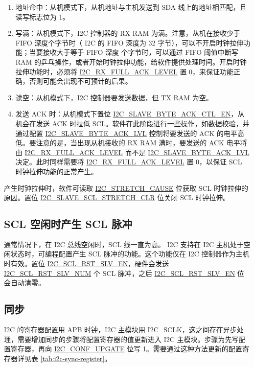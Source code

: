 \documentclass[main\_\_CN.tex]{subfiles}
\begin{document}
\begin{enumerate}
\item 地址命中：从机模式下，从机地址与主机发送到 SDA 线上的地址相匹配，且读写标志位为 1。
\item 写满：从机模式下，I2C 控制器的 RX RAM 为满。注意，从机在接收少于 FIFO 深度个字节时（\chipseries{} I2C 的 FIFO 深度为 32 字节），可以不开启时钟拉伸功能；当要接收大于等于 FIFO 深度 个字节时，可以通过 FIFO 阈值中断写 RAM 的乒乓操作，或者开始时钟拉伸功能，给软件提供处理时间。开启时钟拉伸功能时，必须将 \hyperref[fielddesc:I2CRXFULLACKLEVEL]{I2C\_RX\_FULL\_ACK\_LEVEL} 置 0，来保证功能正确，否则可能会出现不可预计的后果。
\item 读空：从机模式下，I2C 控制器要发送数据，但 TX RAM 为空。
\item 发送 ACK 时：从机模式下置位 \hyperref[fielddesc:I2CSLAVEBYTEACKCTLEN]{I2C\_SLAVE\_BYTE\_ACK\_CTL\_EN}，从机会在发送 ACK 时拉低 SCL。软件在此阶段进行一些操作，如数据校验，并通过配置 \hyperref[fielddesc:I2CSLAVEBYTEACKLVL]{I2C\_SLAVE\_BYTE\_ACK\_LVL} 控制将要发送的 ACK 的电平高低。要注意的是，当出现从机接收的 RX RAM 满时，要发送的 ACK 电平将由 \hyperref[fielddesc:I2CRXFULLACKLEVEL]{I2C\_RX\_FULL\_ACK\_LEVEL} 而不是 \hyperref[fielddesc:I2CSLAVEBYTEACKLVL]{I2C\_SLAVE\_BYTE\_ACK\_LVL} 决定。此时同样需要将 \hyperref[fielddesc:I2CRXFULLACKLEVEL]{I2C\_RX\_FULL\_ACK\_LEVEL} 置 0，以保证 SCL 时钟拉伸功能的正常产生。
\end{enumerate}

产生时钟拉伸时，软件可读取 \hyperref[fielddesc:I2CSTRETCHCAUSE]{I2C\_STRETCH\_CAUSE} 位获取 SCL 时钟拉伸的原因。置位 \hyperref[fielddesc:I2CSLAVESCLSTRETCHCLR]{I2C\_SLAVE\_SCL\_STRETCH\_CLR} 位关闭 SCL 时钟拉伸。

\subsection{SCL 空闲时产生 SCL 脉冲}
通常情况下，在 I2C 总线空闲时，SCL 线一直为高。\chipname{} I2C 支持在 I2C 主机处于空闲状态时，可编程配置产生 SCL 脉冲的功能。这个功能仅在 I2C 控制器作为主机时有效。置位 \hyperref[fielddesc:I2CSCLRSTSLVEN]{I2C\_SCL\_RST\_SLV\_EN}，硬件会发送 \hyperref[fielddesc:I2CSCLRSTSLVNUM]{I2C\_SCL\_RST\_SLV\_NUM} 个 SCL 脉冲，之后 \hyperref[fielddesc:I2CSCLRSTSLVEN]{I2C\_SCL\_RST\_SLV\_EN} 位会自动清零。

\subsection{同步}
I2C 的寄存器配置用 APB 时钟，I2C 主模块用 I2C\_SCLK，这之间存在异步处理，需要增加同步的步骤将配置寄存器的值更新进入 I2C 主模块。步骤为先写配置寄存器，再向 \hyperref[fielddesc:I2CCONFUPGATE]{I2C\_CONF\_UPGATE} 位写 1。需要通过这种方法更新的配置寄存器详见表 \ref{tab:i2c-sync-register}。
\end{document}
